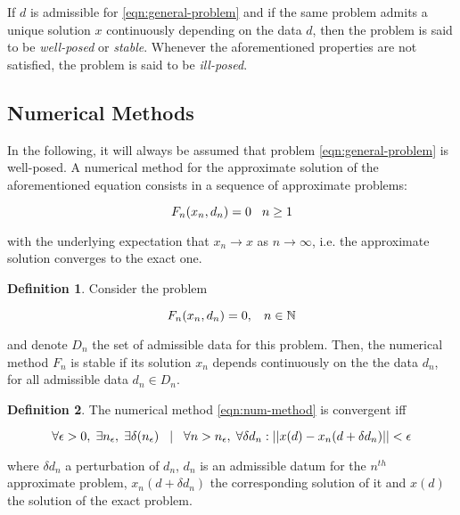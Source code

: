 \documentclass{article}
\theoremstyle{theorem}
\theoremstyle{definition}
\newtheorem{definition}{Definition}
\begin{document}
If $d$ is admissible for \eqref{eqn:general-problem} and if the same problem admits a unique solution $x$ continuously depending on the data $d$, then the problem is said to be \emph{well-posed} or \emph{stable}. Whenever the aforementioned properties are not satisfied, the problem is said to be \emph{ill-posed}.\\

\subsection{Numerical Methods}
In the following, it will always be assumed that problem \eqref{eqn:general-problem} is well-posed. A numerical method for the approximate solution of the aforementioned equation consists in a sequence of approximate problems:

\begin{equation}
	\label{eqn:num-method}
	F_n(x_n, d_n) = 0 \hspace{3mm} n\ge 1
\end{equation}

with the underlying expectation that $x_n\rightarrow x$ as $n\rightarrow\infty$, i.e. the approximate solution converges to the exact one. 

\begin{definition}
	\label{defn:stability}
	Consider the problem 
	
	$$F_n(x_n, d_n)=0, \hspace{3mm} n\in\mathbb{N}$$
	
	and denote $D_n$ the set of admissible data for this problem. Then, the numerical method $F_n$ is stable if its solution $x_n$ depends continuously on the the data $d_n$, for all admissible data $d_n\in D_n$.
\end{definition}

\begin{definition}
	\label{defn:convergence}
The numerical method \eqref{eqn:num-method} is convergent iff

$$\forall\epsilon >0,\hspace{1mm} \exists n_\epsilon,\hspace{1mm} \exists\delta(n_\epsilon)\hspace{3mm} | \hspace{3mm}\forall n > n_\epsilon,\hspace{1mm} \forall\delta d_n : ||x(d)-x_n(d+\delta d_n)||<\epsilon$$

where $\delta d_n$ a perturbation of $d_n$, $d_n$ is an admissible datum for the $n^{th}$ approximate problem,  $x_n(d+\delta d_n)$ the corresponding solution of it and $x(d)$ the solution of the exact problem.
\end{definition}
\end{document}
